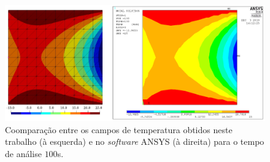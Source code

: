 \documentclass[Tese.tex]{subfiles}
\begin{document}
\begin{figure}[!htb]
	\centering
	\caption{Coomparação entre os campos de temperatura obtidos neste trabalho (à esquerda) e no \emph{software} ANSYS (à direita) para o tempo de análise $100$s.}
	\label{fig:thermo1-comparacao}
	\includegraphics[scale=0.35]{Figuras/ThermoExample1/Thermo1-comparacao.png}
\end{figure}
\end{document}
